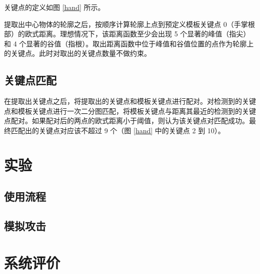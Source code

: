 \documentclass[UTF8, a4paper, fontset=none]{article}
\begin{document}
关键点的定义如图 \ref{hand} 所示。

提取出中心物体的轮廓之后，按顺序计算轮廓上点到预定义模板关键点 0（手掌根部）的欧式距离。理想情况下，该距离函数至少会出现 5 个显著的峰值（指尖）和 4 个显著的谷值（指根）。取出距离函数中位于峰值和谷值位置的点作为轮廓上的关键点。此时对取出的关键点数量不做约束。

\subsection{关键点匹配}

在提取出关键点之后，将提取出的关键点和模板关键点进行配对。对检测到的关键点和模板关键点进行一次二分图匹配，将模板关键点与距离其最近的检测到的关键点配对。如果配对后的两点的欧式距离小于阈值，则认为该关键点对匹配成功。最终匹配出的关键点对应该不超过 9 个（图 \ref{hand} 中的关键点 2 到 10）。

\section{实验}

    \subsection{使用流程}

    \subsection{模拟攻击}

\section{系统评价}
\end{document}
